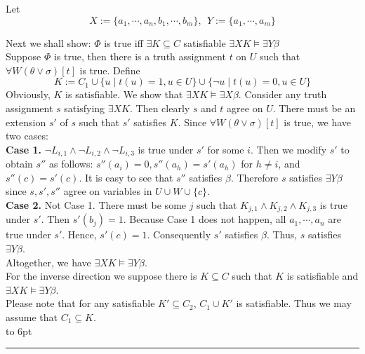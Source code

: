\documentclass[12pt]{article}
\newenvironment{proof}{\parindent=0pt{\bf Proof: }}{
   \hspace*{\fill}\hbox to 6pt{\leaders\hrule width 6pt height 6pt\hfill}\par}
\begin{document}
\begin{proof}
Let
$$X:=\{a_1,\cdots, a_n, b_1,\cdots, b_m\}, \ \ Y:=\{a_1,\cdots, a_m\}$$


Next we shall show: $\Phi$ is true iff $\exists K\subseteq C$ satisfiable $\exists X K\models \exists Y\beta$\\

Suppose $\Phi$ is true, then there is a truth assignment $t$ on $U$ such that $\forall W(\theta\vee \sigma)[t]$ is true.
Define
$$K:=C_1\cup\{u\mid t(u)=1, u\in U\}\cup\{\neg u\mid t(u)=0, u\in U\}$$
Obviously, $K$ is satisfiable. We show that $\exists X K\models\exists X\beta$. Consider any truth assignment $s$ satisfying $\exists X K$. Then clearly $s$ and $t$ agree on $U$.
There must be an extension $s'$ of $s$ such that $s'$ satisfies $K$.  Since  $\forall W(\theta\vee \sigma)[t]$ is true, we have two cases:\\

{\bf Case 1.} $\neg L_{i,1}\wedge\neg L_{i,2}\wedge \neg L_{i,3}$ is true under $s'$ for some $i$. Then we modify $s'$ to obtain $s''$ as follows:
%
$s''(a_i)=0, s''(a_h)=s'(a_h)$ for $h\not=i$, and $s''(c)=s'(c)$. It is easy to see that $s''$ satisfies $\beta$. Therefore $s$ satisfies $\exists Y\beta$ since $s, s', s''$ agree on variables in $U\cup W\cup\{c\}$.\\

{\bf Case 2.} Not Case 1. There must be some $j$ such that $K_{j,1}\wedge K_{j,2}\wedge K_{j,3}$ is true under $s'$. Then $s'(b_j)=1$. Because Case 1 does not happen, all $a_1,\cdots,a_n$ are true under $s'$. Hence, $s'(c)=1$. Consequently $s'$ satisfies $\beta$. Thus, $s$ satisfies $\exists Y\beta$.\\


Altogether, we have $\exists X K\models \exists Y \beta$. \\


For the inverse direction we suppose there is $K\subseteq C$ such that $K$ is satisfiable and $\exists X K\models \exists Y \beta$. \\

Please note that for any satisfiable $K'\subseteq C_2$, $C_1\cup K'$ is satisfiable. Thus we may assume that $C_1\subseteq K$.\\



\end{proof}
\end{document}
